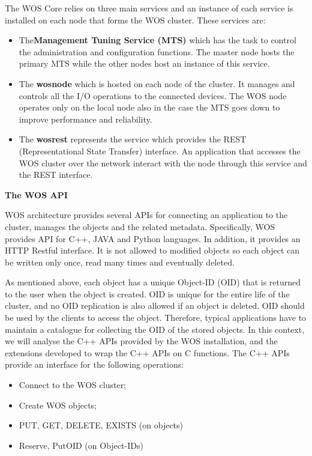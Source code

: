 The WOS Core relies on three main services and an instance of each service is installed on each node that forms the WOS cluster. These services are:
\begin{itemize}
\item The\textbf{Management Tuning Service (MTS)} which has the task to control the administration and configuration functions.
The master node hosts the primary MTS while the other nodes host an instance of this service.

\item The \textbf{wosnode} which is hosted on each node of the cluster. It manages and controls all the I/O operations to the connected devices. The WOS node operates only on the local node also in the case the MTS goes down to improve performance and reliability.

\item The \textbf{wosrest} represents the service which provides the REST (Representational State Transfer) interface. An application that accesses the WOS cluster over the network interact with the node through this service and the REST interface.
\end{itemize}

\textbf{The WOS API}

WOS architecture provides several APIs for connecting an application to the cluster, manages the objects and the related metadata.
Specifically, WOS provides API for C++, JAVA and Python languages.
In addition, it provides an HTTP Restful interface.
It is not allowed to modified objects so each object can be written only once, read many times and eventually deleted.

As mentioned above, each object has a unique Object-ID (OID) that is returned to the user when the object is created.
OID is unique for the entire life of the cluster, and no OID replication is also allowed if an object is deleted.
OID should be used by the clients to access the object. Therefore, typical applications have to maintain a catalogue for collecting the OID of the stored objects.
In this context, we will analyse the C++ APIs provided by the WOS installation, and the extensions developed to wrap the C++ APIs on C functions.
The C++ APIs provide an interface for the following operations:
\begin{itemize}
	\item Connect to the WOS cluster;
	\item Create WOS objects;
	\item PUT, GET, DELETE, EXISTS (on objects)
	\item Reserve, PutOID (on Object-IDs)
\end{itemize}

